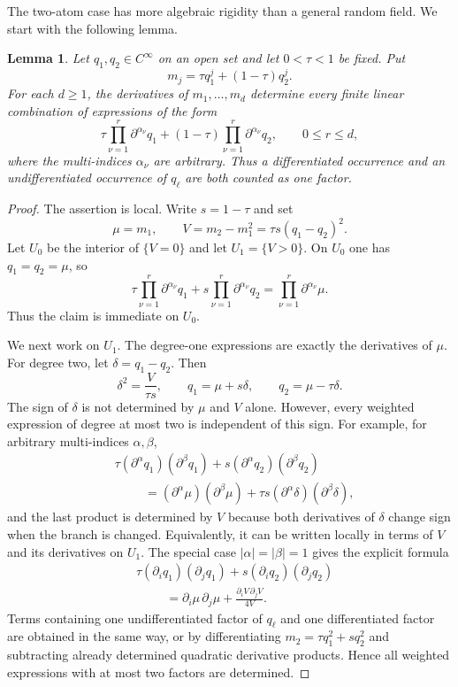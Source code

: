 \documentclass[11pt]{article}
\theoremstyle{plain}
\newtheorem{lemma}[theorem]{Lemma}
\theoremstyle{definition}
\theoremstyle{remark}
\begin{document}
The two-atom case has more algebraic rigidity than a general random field. We start with the following lemma.
\begin{lemma}\label{lem:two-atom-jet-closure}
Let $q_1,q_2\in C^\infty$ on an open set and let $0<\tau<1$ be fixed.  Put
\[
  m_j=\tau q_1^j+(1-\tau)q_2^j.
\]
For each $d\ge1$, the derivatives of $m_1,\dots,m_d$ determine every finite linear combination of expressions of the form
\[
  \tau\prod_{\nu=1}^r \partial^{\alpha_\nu}q_1
  +(1-\tau)\prod_{\nu=1}^r \partial^{\alpha_\nu}q_2,
  \qquad 0\le r\le d,
\]
where the multi-indices $\alpha_\nu$ are arbitrary.  Thus a differentiated occurrence and an undifferentiated occurrence of $q_\ell$ are both counted as one factor.
\end{lemma}

\begin{proof}
The assertion is local.  Write $s=1-\tau$ and set
\[
  \mu=m_1,
  \qquad
  V=m_2-m_1^2=\tau s(q_1-q_2)^2.
\]
Let $U_0$ be the interior of $\{V=0\}$ and let $U_1=\{V>0\}$.  On $U_0$ one has $q_1=q_2=\mu$, so
\[
  \tau\prod_{\nu=1}^r \partial^{\alpha_\nu}q_1
  +s\prod_{\nu=1}^r \partial^{\alpha_\nu}q_2
  =\prod_{\nu=1}^r \partial^{\alpha_\nu}\mu.
\]
Thus the claim is immediate on $U_0$.

We next work on $U_1$.  The degree-one expressions are exactly the derivatives of $\mu$.  For degree two, let $\delta=q_1-q_2$.  Then
\[
  \delta^2=\frac{V}{\tau s},
  \qquad
  q_1=\mu+s\delta,
  \qquad
  q_2=\mu-\tau\delta .
\]
The sign of $\delta$ is not determined by $\mu$ and $V$ alone.  However, every weighted expression of degree at most two is independent of this sign.  For example, for arbitrary multi-indices $\alpha,\beta$,
\begin{equation}\label{eq:two-atom-quadratic-jets}
\begin{split}
&\tau(\partial^\alpha q_1)(\partial^\beta q_1)
+s(\partial^\alpha q_2)(\partial^\beta q_2) \\
&\hspace{1cm}
=(\partial^\alpha\mu)(\partial^\beta\mu)
 +\tau s(\partial^\alpha\delta)(\partial^\beta\delta),
\end{split}
\end{equation}
and the last product is determined by $V$ because both derivatives of $\delta$ change sign when the branch is changed.  Equivalently, it can be written locally in terms of $V$ and its derivatives on $U_1$.  The special case $|\alpha|=|\beta|=1$ gives the explicit formula
\[
\begin{split}
&\tau(\partial_iq_1)(\partial_jq_1)
 +s(\partial_iq_2)(\partial_jq_2) \\
&\hspace{1cm}=\partial_i\mu\,\partial_j\mu
  +\frac{\partial_iV\,\partial_jV}{4V}.
\end{split}
\]
Terms containing one undifferentiated factor of $q_\ell$ and one differentiated factor are obtained in the same way, or by differentiating $m_2=\tau q_1^2+s q_2^2$ and subtracting already determined quadratic derivative products.  Hence all weighted expressions with at most two factors are determined.


\end{proof}
\end{document}
